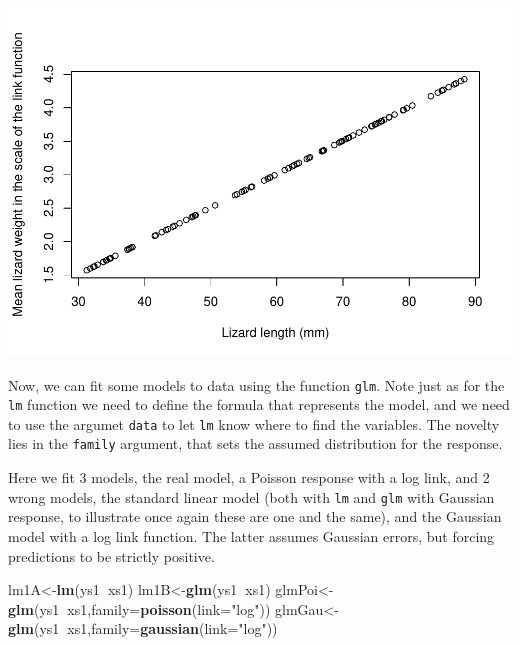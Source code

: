 \documentclass[
]{book}
\newenvironment{Shaded}{\begin{snugshade}}{\end{snugshade}}
\newcommand{\DataTypeTok}[1]{\textcolor[rgb]{0.13,0.29,0.53}{#1}}
\newcommand{\KeywordTok}[1]{\textcolor[rgb]{0.13,0.29,0.53}{\textbf{#1}}}
\newcommand{\NormalTok}[1]{#1}
\newcommand{\OperatorTok}[1]{\textcolor[rgb]{0.81,0.36,0.00}{\textbf{#1}}}
\newcommand{\StringTok}[1]{\textcolor[rgb]{0.31,0.60,0.02}{#1}}
\begin{document}
\includegraphics{ECOMODbook_files/figure-latex/unnamed-chunk-2-1.pdf}

Now, we can fit some models to data using the function \texttt{glm}. Note just as for the \texttt{lm} function we need to define the formula that represents the model, and we need to use the argumet \texttt{data} to let \texttt{lm} know where to find the variables. The novelty lies in the \texttt{family} argument, that sets the assumed distribution for the response.

Here we fit 3 models, the real model, a Poisson response with a log link, and 2 wrong models, the standard linear model (both with \texttt{lm} and \texttt{glm} with Gaussian response, to illustrate once again these are one and the same), and the Gaussian model with a log link function. The latter assumes Gaussian errors, but forcing predictions to be strictly positive.

\begin{Shaded}
\begin{Highlighting}[]
\NormalTok{lm1A<-}\KeywordTok{lm}\NormalTok{(ys1}\OperatorTok{~}\NormalTok{xs1)}
\NormalTok{lm1B<-}\KeywordTok{glm}\NormalTok{(ys1}\OperatorTok{~}\NormalTok{xs1)}
\NormalTok{glmPoi<-}\KeywordTok{glm}\NormalTok{(ys1}\OperatorTok{~}\NormalTok{xs1,}\DataTypeTok{family=}\KeywordTok{poisson}\NormalTok{(}\DataTypeTok{link=}\StringTok{"log"}\NormalTok{))}
\NormalTok{glmGau<-}\KeywordTok{glm}\NormalTok{(ys1}\OperatorTok{~}\NormalTok{xs1,}\DataTypeTok{family=}\KeywordTok{gaussian}\NormalTok{(}\DataTypeTok{link=}\StringTok{"log"}\NormalTok{))}
\end{Highlighting}
\end{Shaded}
\end{document}
